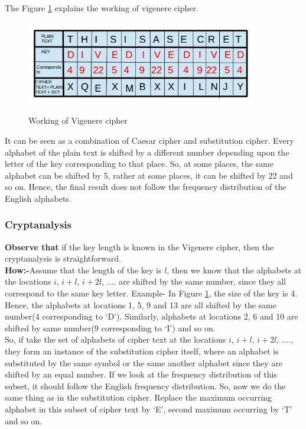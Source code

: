 \documentclass[a4paper]{article}
\begin{document}
The Figure \ref{vigenere} explains the working of vigenere cipher.

\begin{figure}[h]
\centering
\includegraphics[width=0.9\textwidth]{vigenere.jpg}
\label{vigenere}
\caption{Working of Vigenere cipher}
\end{figure}

It can be seen as a combination of Caesar cipher and substitution cipher. Every alphabet of the plain text is shifted by a different number depending upon the letter of the key corresponding to that place. So, at some places, the same alphabet can be shifted by 5, rather at some places, it can be shifted by 22 and so on. Hence, the final result does not follow the frequency distribution of the English alphabets. 

\subsubsection{Cryptanalysis}

\textbf{Observe that} if the key length is known in the Vigenere cipher, then the cryptanalysis is straightforward. \\

\textbf{{\large How:-}}Assume that the length of the key is $l$, then we know that the alphabets at the locations $i$, $i+l$, $i+2l$, .... are shifted by the same number, since they all correspond to the same key letter. Example- In Figure \ref{vigenere}, the size of the key is 4. Hence, the alphabets at locations 1, 5, 9 and 13 are all shifted by the same number(4 corresponding to `D'). Similarly, alphabets at locations 2, 6 and 10 are shifted by same number(9 corresponding to `I') and so on. \\

So, if take the set of alphabets of cipher text at the locations $i$, $i+l$, $i+2l$, ...., they form an instance of the substitution cipher itself, where an alphabet is substituted by the same symbol or the same another alphabet since they are shifted by an equal number. If we look at the frequency distribution of this subset, it should follow the English frequency distribution. So, now we do the same thing as in the substitution cipher. Replace the maximum occurring alphabet in this subset of cipher text by `E', second maximum occurring by `T' and so on. \\
\end{document}
